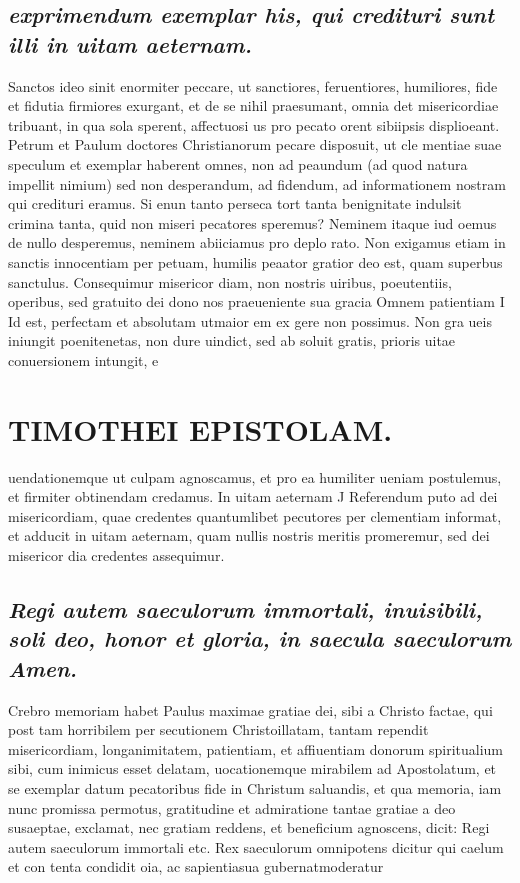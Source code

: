\documentclass{article}
\begin{document}
\begin{pages}
\subsection*{\textit{exprimendum exemplar his, qui credituri sunt illi in uitam aeternam. }}\pstart Sanctos ideo sinit enormiter peccare, ut sanctiores, feruentiores, humiliores, fide et fidutia firmiores exurgant, et de se nihil praesumant, omnia det misericordiae tribuant, in qua sola sperent, affectuosi us pro pecato orent sibiipsis displioeant. Petrum et Paulum doctores Christianorum pecare disposuit, ut cle mentiae suae speculum et exemplar haberent omnes, non ad peaundum (ad quod natura impellit nimium) sed non desperandum, ad fidendum, ad informationem nostram qui credituri eramus. Si enun tanto perseca tort tanta benignitate indulsit crimina tanta, quid non miseri pecatores speremus? Neminem itaque iud oemus de nullo desperemus, neminem abiiciamus pro deplo rato. Non exigamus etiam in sanctis innocentiam per petuam, humilis peaator gratior deo est, quam superbus sanctulus.  \pend\pstart Consequimur misericor diam, non nostris uiribus, poeutentiis, operibus, sed gratuito dei dono nos praeueniente sua gracia  \pend\pstart Omnem patientiam I Id est, perfectam et absolutam utmaior em ex gere non possimus. Non gra ueis iniungit poenitenetas, non dure uindict, sed ab soluit gratis, prioris uitae conuersionem intungit, e\pend
\section*{TIMOTHEI EPISTOLAM. }
\marginpar{[ p.35 ]}\pstart uendationemque ut culpam agnoscamus, et pro ea humiliter ueniam postulemus, et firmiter obtinendam credamus.  \pend\pstart In uitam aeternam J Referendum puto ad dei misericordiam, quae credentes quantumlibet pecutores per clementiam informat, et adducit in uitam aeternam, quam nullis nostris meritis promeremur, sed dei misericor dia credentes assequimur.  \pend
{}
{}
\subsection*{\textit{Regi autem saeculorum immortali, inuisibili, soli deo, honor et gloria, in saecula saeculorum Amen. }}\pstart Crebro memoriam habet Paulus maximae gratiae dei, sibi a Christo factae, qui post tam horribilem per secutionem Christoillatam, tantam rependit misericordiam, longanimitatem, patientiam, et affiuentiam donorum spiritualium sibi, cum inimicus esset delatam, uocationemque mirabilem ad Apostolatum, et se exemplar datum pecatoribus fide in Christum saluandis, et qua memoria, iam nunc promissa permotus, gratitudine et admiratione tantae gratiae a deo susaeptae, exclamat, nec gratiam reddens, et beneficium agnoscens, dicit: Regi autem saeculorum immortali etc.  \pend\pstart Rex saeculorum omnipotens dicitur qui caelum et con tenta condidit oia, ac sapientiasua gubernatmoderatur  \pend

\end{pages}
\end{document}
